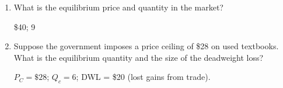 \documentclass[pdf, handout]{beamer}
\begin{document}
\begin{frame}

\begin{enumerate}

\item What is the equilibrium price and quantity in the market?

	\pause
	\begin{flushright}
		
		\color{red} \$40; 9
	\end{flushright}
	
\pause

\item Suppose the government imposes a price ceiling of \$28 on used textbooks. What is the equilibrium quantity and the size of the deadweight loss?

	\pause
	\begin{flushright}
		
		\color{red} $P_C = \$28$; $Q_c= 6$; DWL = \$20 (lost gains from trade).
	\end{flushright}

\end{enumerate}

\end{frame}
\end{document}
